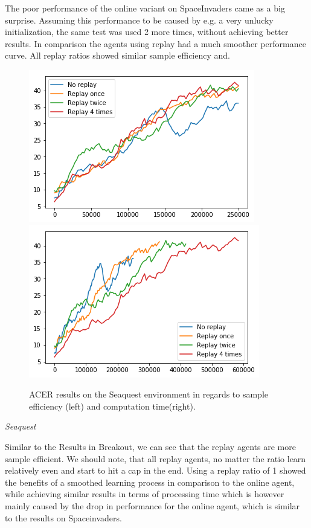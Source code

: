 The poor performance of the online variant on SpaceInvaders came as a big surprise. Assuming this performance to be caused by e.g. a very unlucky initialization, the same test was used 2 more times, without achieving better results. In comparison the agents using replay had a much smoother performance curve.
All replay ratios showed similar sample efficiency and.
\begin{figure}[h]
\includegraphics[scale=0.55]{bilder/seaquestbyonline.png}
\includegraphics[scale=0.55]{bilder/seaquestbytime.png}
\caption{ACER results on the Seaquest environment in regards to sample efficiency (left) and computation time(right).}
\label{seafig}
\end{figure}

\textit{Seaquest}

Similar to the Results in Breakout, we can see that the replay agents are more sample efficient. We should note, that all replay agents, no matter the ratio learn relatively even and start to hit a cap in the end.
Using a replay ratio of 1 showed the benefits of a smoothed learning process in comparison to the online agent, while achieving similar results in terms of processing time which is however mainly caused by the drop in performance for the online agent, which is similar to the results on Spaceinvaders.

